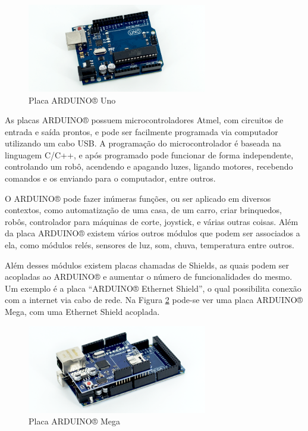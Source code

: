 \documentclass[
	12pt,			%
	openright,		%
	oneside,			%
	a4paper,			%
	chapter=TITLE,		%
	english,			%
	brazil,			%
	]{abntex2}
\begin{document}
\begin{figure}[H]
	\centering
		\includegraphics[width=0.7\textwidth]{./img/img-16.png}
		\caption{Placa ARDUINO® Uno}
		\label{img:img-16}
\end{figure}

As placas ARDUINO® possuem microcontroladores Atmel, com circuitos de entrada e saída prontos, e pode ser facilmente programada via computador utilizando um cabo USB. A programação do microcontrolador é baseada na linguagem C/C++, e após programado pode funcionar de forma independente, controlando um robô, acendendo e apagando luzes, ligando motores, recebendo comandos e os enviando para o computador, entre outros.

O ARDUINO® pode fazer inúmeras funções, ou ser aplicado em diversos contextos, como automatização de uma casa, de um carro, criar brinquedos, robôs, controlador para máquinas de corte, joystick, e várias outras coisas. Além da placa ARDUINO® existem vários outros módulos que podem ser associados a ela, como módulos relés, sensores de luz, som, chuva, temperatura entre outros.

Além desses módulos existem placas chamadas de Shields, as quais podem ser acopladas ao ARDUINO® e aumentar o número de funcionalidades do mesmo. Um exemplo é a placa “ARDUINO® Ethernet Shield”, o qual possibilita conexão com a internet via cabo de rede. Na Figura \ref{img:img-15} pode-se ver uma placa ARDUINO® Mega, com uma Ethernet Shield acoplada.

\begin{figure}[H]
	\centering
		\includegraphics[width=0.7\textwidth]{./img/img-15.png}
		\caption{Placa ARDUINO® Mega}
		\label{img:img-15}
\end{figure}
\end{document}
